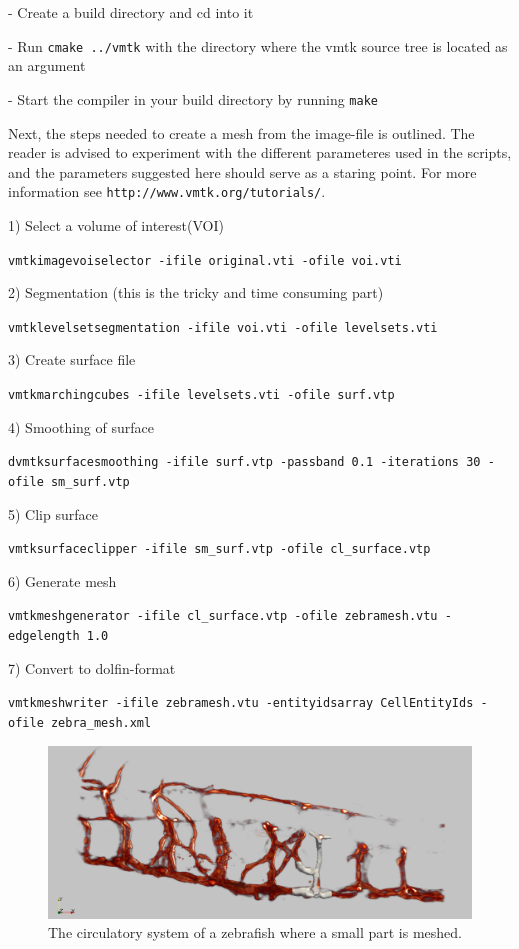 \documentclass[epsfig,11pt]{article}
\begin{document}
- Create a build directory and cd into it

- Run \texttt{cmake ../vmtk} with the directory where the vmtk source tree is located as an argument 

- Start the compiler in your build directory by running \texttt{make}

Next, the steps needed to create a mesh from the image-file is outlined. The reader is advised to experiment with the different parameteres used in the scripts, and the parameters suggested here should serve as a staring point. For more information see \texttt{http://www.vmtk.org/tutorials/}.



1) Select a volume of interest(VOI)
\begin{framed}       
    \texttt{vmtkimagevoiselector -ifile original.vti -ofile voi.vti}
\end{framed}
2) Segmentation (this is the tricky and time consuming part)
\begin{framed}       
    \texttt{vmtklevelsetsegmentation -ifile voi.vti -ofile levelsets.vti}
\end{framed}
3) Create surface file
\begin{framed}       
    \texttt{vmtkmarchingcubes -ifile levelsets.vti -ofile surf.vtp}
\end{framed}
4) Smoothing of surface
\begin{framed}       
    \texttt{dvmtksurfacesmoothing -ifile surf.vtp -passband 0.1 -iterations 30 -ofile sm\_surf.vtp}
\end{framed}
5) Clip surface
\begin{framed}       
    \texttt{vmtksurfaceclipper -ifile sm\_surf.vtp -ofile cl\_surface.vtp}
\end{framed}
6) Generate mesh
\begin{framed}       
    \texttt{vmtkmeshgenerator -ifile cl\_surface.vtp -ofile zebramesh.vtu -edgelength
1.0}
\end{framed}
7) Convert to dolfin-format
\begin{framed}       
    \texttt{vmtkmeshwriter -ifile zebramesh.vtu -entityidsarray CellEntityIds -ofile zebra\_mesh.xml}
\end{framed}


 \begin{figure}[h!] 
\begin{center}
  \includegraphics[scale=0.3]{overview2.png}
  \end{center}
  \caption{The circulatory system of a zebrafish where a small part is meshed.}
\end{figure}
\end{document}
